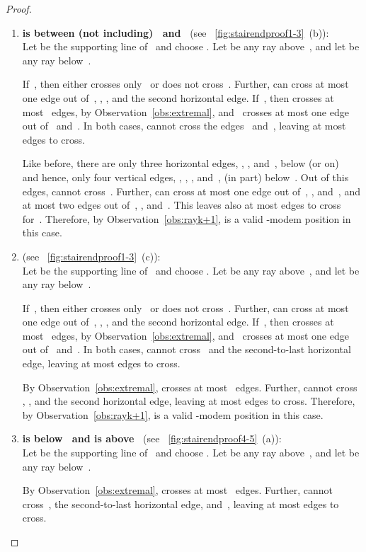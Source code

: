 \documentclass[A4]{article}
\begin{document}
\begin{proof}
\begin{enumerate}
\item \textbf{ is between (not including)~ and~} (see \figurename~\ref{fig:stairendproof1-3}~(b)):\\
Let  be the supporting line of~ and choose .
Let  be any ray above~, and let  be any ray below~.

If~, then  either crosses only~ or does not cross~.
Further,  can cross at most one edge out of~, , , and the second horizontal edge.
If~, then  crosses at most~ edges, by Observation~\ref{obs:extremal}, and~ crosses at most one edge out of~ and~.
In both cases,  cannot cross the edges~ and~, leaving at most  edges to cross.

Like before, there are only three horizontal edges, , , and~, below (or on)~ and hence, only four vertical edges, , , , and~, (in part) below~. 
Out of this  edges,  cannot cross~.
Further,  can cross at most one edge out of~, , and~, and at most two edges out of~, , and~.
This leaves also at most  edges to cross for~.
Therefore, by Observation~\ref{obs:rayk+1},  is a valid \mbox{-modem} position in this case.

\item \textbf{} (see \figurename~\ref{fig:stairendproof1-3}~(c)):\\
Let  be the supporting line of~ and choose .
Let  be any ray above~, and let  be any ray below~.

If~, then  either crosses only~ or does not cross~.
Further,  can cross at most one edge out of~, , , and the second horizontal edge.
If~, then  crosses at most~ edges, by Observation~\ref{obs:extremal}, and~ crosses at most one edge out of~ and~.
In both cases,  cannot cross~ and the second-to-last horizontal edge, leaving at most  edges to cross.

By Observation~\ref{obs:extremal},  crosses at most~ edges.
Further,  cannot cross , , and the second horizontal edge, leaving at most  edges to cross.
Therefore, by Observation~\ref{obs:rayk+1},  is a valid \mbox{-modem} position in this case.

\item \textbf{ is below~ and  is above~} (see \figurename~\ref{fig:stairendproof4-5}~(a)):\\
Let  be the supporting line of~ and choose .
Let  be any ray above~, and let  be any ray below~.

By Observation~\ref{obs:extremal},  crosses at most~ edges.
Further,  cannot cross~, the second-to-last horizontal edge, and~, leaving at most  edges to cross.


\end{enumerate}
\end{proof}
\end{document}
